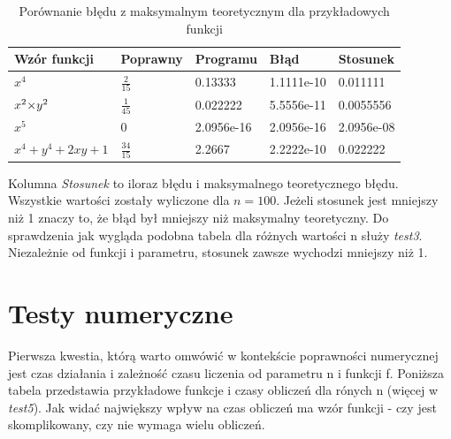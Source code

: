 \documentclass[a4paper,12pt]{article}
\newcommand{\razy}{\hspace{-0.5ex}\times\hspace{-0.5ex}} %
\begin{document}
\begin{table}[h]
\begin{center}
\begin{tabular}{lllll}
\textbf{Wzór funkcji} & \textbf{Poprawny} & \textbf{Programu} & \textbf{Błąd} & \textbf{Stosunek} \\
\hline
$x^4$ & $\frac{2}{15}$ & 0.13333 & 1.1111e-10 & 0.011111 \\
$x^2 \razy y^2 $& $\frac{1}{45}$ & 0.022222 & 5.5556e-11 & 0.0055556 \\
$x^5$ & 0 & 2.0956e-16 & 2.0956e-16 & 2.0956e-08 \\
$x^4 + y^4 + 2xy + 1 $& $\frac{34}{15}$ & 2.2667 & 2.2222e-10 & 0.022222 
\end{tabular}
\footnotesize \caption{\label{1}Porównanie błędu z maksymalnym teoretycznym dla przykładowych funkcji}
\end{center}
\end{table}
\vspace{-6mm}%
Kolumna \emph{Stosunek} to iloraz błędu i maksymalnego teoretycznego błędu. Wszystkie wartości zostały wyliczone dla $n=100$. Jeżeli stosunek jest mniejszy niż 1 znaczy to, że błąd był mniejszy niż maksymalny teoretyczny. Do sprawdzenia jak wygląda podobna tabela dla różnych wartości n służy \emph{test3}. Niezależnie od funkcji i parametru, stosunek zawsze wychodzi mniejszy niż 1. 

\section*{Testy numeryczne}
Pierwsza kwestia, którą warto omwówić w kontekście poprawności numerycznej jest czas działania i zależność czasu liczenia od parametru n i funkcji f. Poniższa tabela przedstawia przykładowe funkcje i czasy obliczeń dla rónych n (więcej w \emph{test5}). Jak widać największy wpływ na czas obliczeń ma wzór funkcji - czy jest skomplikowany, czy nie wymaga wielu obliczeń.
\end{document}
